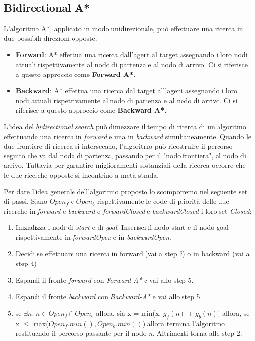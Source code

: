 \documentclass[11pt]{article}
\begin{document}
\subsection{Bidirectional A*}
\par{L'algoritmo A*, applicato in modo unidirezionale, pu\`o effettuare una ricerca in due possibili direzioni opposte:
\begin{itemize}
\item \textbf{Forward}: A* effettua una ricerca dall'agent al target assegnando i loro nodi attuali rispettivamente al nodo di partenza e al nodo di arrivo. Ci si riferisce a questo approccio come \textbf{Forward A*}.
\item \textbf{Backward}: A* effettua una ricerca dal target all'agent assegnando i loro nodi attuali rispettivamente al nodo di partenza e al nodo di arrivo. Ci si riferisce a questo approccio come \textbf{Backward A*.}
\end{itemize}}
\par{
L'idea del \emph{bidirectional search} pu\`o dimezzare il tempo di ricerca di un algoritmo effettuando una ricerca in \emph{forward} e una in \emph{backward} simultaneamente. Quando le due frontiere di ricerca si intersecano, l'algoritmo pu\`o ricostruire il percorso seguito che va dal nodo di partenza, passando per il "nodo frontiera", al nodo di arrivo. Tuttavia per garantire miglioramenti sostanziali della ricerca occorre che le due ricerche opposte si incontrino a met\`a strada.}
\par{Per dare l'idea generale dell'algoritmo proposto lo scomporremo nel seguente set di passi. Siano \emph{$Open_{f}$} e \emph{$Open_{b}$} rispettivamente le code di priorit\`a delle due ricerche in \emph{forward} e \emph{backward} e \emph{forwardClosed} e \emph{backwardClosed} i loro set \emph{Closed}:

\begin{enumerate}
\item Inizializza i nodi di \emph{start} e di \emph{goal}. Inserisci il nodo start e il nodo goal rispettivamente in \emph{forwardOpen} e in \emph{backwardOpen}.
\item Decidi se effettuare una ricerca in forward (vai a step 3) o in backward (vai a step 4)
\item Espandi il fronte \emph{forward} con \emph{Forward-A*} e vai allo step 5.
\item Espandi il fronte \emph{backward} con \emph{Backward-A*} e vai allo step 5.
\item se $\exists n$: $n \in Open_f \cap Open_b$ allora, sia x = min(x, $g_{f}(n)$ + $g_{b}(n))$ allora, se x $\leq$ max($Open_{f}.min(), Open_{b}.min() $) allora termina l'algoritmo restituendo il percorso passante per il nodo \emph{n}. 
Altrimenti torna allo step 2.
\end{enumerate}

}
\end{document}
